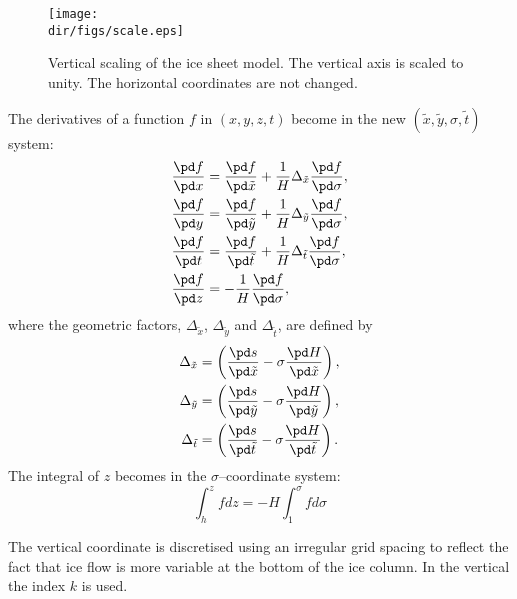 \begin{figure}[htbp]
  \begin{center}
    \texttt{[image: \\dir/figs/scale.eps]}
    \caption[Vertical scaling of the ice sheet model.]{Vertical scaling of the ice sheet model. The vertical axis is scaled to unity. The horizontal coordinates are not changed.}
    \label{kin.fig.scale}
  \end{center}
\end{figure}


The derivatives of a function $f$ in $(x,y,z,t)$ become in the new $(\tilde{x},\tilde{y},\sigma,\tilde{t})$ system:
\begin{subequations}
  \begin{align}
    \frac{\pd f}{\pd x} &= \frac{\pd f}{\pd\tilde{x}}+\frac1H\Delta_{\tilde{x}}\frac{\pd f}{\pd \sigma},\\
    \frac{\pd f}{\pd y} &= \frac{\pd f}{\pd\tilde{y}}+\frac1H\Delta_{\tilde{y}}\frac{\pd f}{\pd \sigma},\\
    \frac{\pd f}{\pd t} &= \frac{\pd f}{\pd\tilde{t}}+\frac1H\Delta_{\tilde{t}}\frac{\pd f}{\pd \sigma},\\
    \frac{\pd f}{\pd z} &= -\frac1H\frac{\pd f}{\pd\sigma},
  \end{align}
\end{subequations}
where  the geometric factors, $\Delta_{\tilde{x}}$, $\Delta_{\tilde{y}}$ and $\Delta_{\tilde{t}}$, are defined by
\begin{subequations}
  \begin{align}
  \Delta_{\tilde{x}}&=\left(\frac{\pd s}{\pd\tilde{x}}-\sigma\frac{\pd H}{\pd\tilde{x}}\right),\\
  \Delta_{\tilde{y}}&=\left(\frac{\pd s}{\pd\tilde{y}}-\sigma\frac{\pd H}{\pd\tilde{y}}\right),\\
  \Delta_{\tilde{t}}&=\left(\frac{\pd s}{\pd\tilde{t}}-\sigma\frac{\pd H}{\pd\tilde{t}}\right).
  \end{align}
\end{subequations}
The integral of $z$ becomes in the $\sigma$--coordinate system:
\begin{equation}
  \int_h^zfdz=-H\int_1^\sigma fd\sigma
\end{equation}

The vertical coordinate is discretised using an irregular grid spacing to reflect the fact that ice flow is more variable at the bottom of the ice column. In the vertical the index $k$ is used. 
